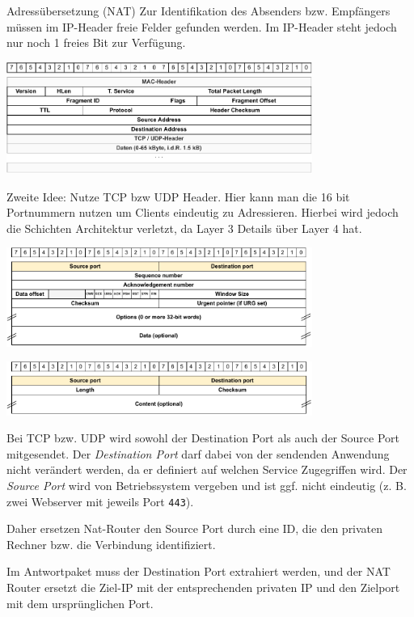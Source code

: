\begin{defi}{Adressübersetzung (NAT)}
    Zur Identifikation des Absenders bzw. Empfängers müssen im IP-Header freie Felder gefunden werden.
    Im IP-Header steht jedoch nur noch 1 freies Bit zur Verfügung.

    \begin{center}
        \includegraphics[width=0.75\textwidth]{includes/figures/defi_ip_header.pdf}
    \end{center}

    Zweite Idee: Nutze TCP bzw UDP Header.
    Hier kann man die 16 bit Portnummern nutzen um Clients eindeutig zu Adressieren.
    Hierbei wird jedoch die Schichten Architektur verletzt, da Layer 3 Details über Layer 4 hat.

    \begin{center}
        \includegraphics[width=0.75\textwidth]{includes/figures/defi_tcp_header_port.pdf}

        \includegraphics[width=0.75\textwidth]{includes/figures/defi_udp_header_port.pdf}
    \end{center}

    Bei TCP bzw. UDP wird sowohl der Destination Port als auch der Source Port mitgesendet.
    Der \emph{Destination Port} darf dabei von der sendenden Anwendung nicht verändert werden, da er definiert auf welchen Service Zugegriffen wird.
    Der \emph{Source Port} wird von Betriebssystem vergeben und ist ggf. nicht eindeutig (z. B. zwei Webserver mit jeweils Port \texttt{443}).

    Daher ersetzen Nat-Router den Source Port durch eine ID, die den privaten Rechner bzw. die Verbindung identifiziert.

    Im Antwortpaket muss der Destination Port extrahiert werden, und der NAT Router ersetzt die Ziel-IP mit der entsprechenden privaten IP und den Zielport mit dem ursprünglichen Port.
\end{defi}

